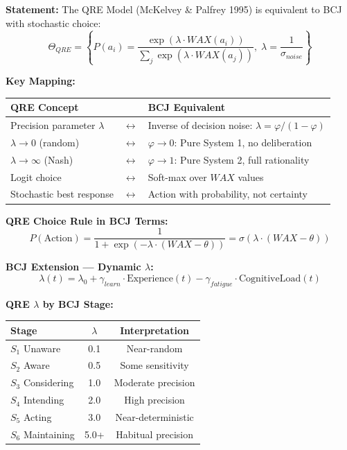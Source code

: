 \begin{tcolorbox}[colback=green!5!white, colframe=green!75!black,
    title=Theorem BCJ-T28: Quantal Response Equilibrium (QRE) as Special Case]
\textbf{Statement:} The QRE Model (McKelvey \& Palfrey 1995) is equivalent to BCJ with stochastic choice:
\begin{equation}
\Theta_{QRE} = \left\{P(a_i) = \frac{\exp(\lambda \cdot WAX(a_i))}{\sum_j \exp(\lambda \cdot WAX(a_j))}, \; \lambda = \frac{1}{\sigma_{noise}}\right\}
\end{equation}

\textbf{Key Mapping:}
\begin{center}
\begin{tabular}{lcl}
\toprule
\textbf{QRE Concept} & & \textbf{BCJ Equivalent} \\
\midrule
Precision parameter $\lambda$ & $\leftrightarrow$ & Inverse of decision noise: $\lambda = \varphi / (1-\varphi)$ \\
$\lambda \to 0$ (random) & $\leftrightarrow$ & $\varphi \to 0$: Pure System 1, no deliberation \\
$\lambda \to \infty$ (Nash) & $\leftrightarrow$ & $\varphi \to 1$: Pure System 2, full rationality \\
Logit choice & $\leftrightarrow$ & Soft-max over $WAX$ values \\
Stochastic best response & $\leftrightarrow$ & Action with probability, not certainty \\
\bottomrule
\end{tabular}
\end{center}

\textbf{QRE Choice Rule in BCJ Terms:}
\begin{equation}
P(\text{Action}) = \frac{1}{1 + \exp\left(-\lambda \cdot (WAX - \theta)\right)} = \sigma\left(\lambda \cdot (WAX - \theta)\right)
\end{equation}

\textbf{BCJ Extension --- Dynamic $\lambda$:}
\begin{equation}
\lambda(t) = \lambda_0 + \gamma_{learn} \cdot \text{Experience}(t) - \gamma_{fatigue} \cdot \text{CognitiveLoad}(t)
\end{equation}

\textbf{QRE $\lambda$ by BCJ Stage:}
\begin{center}
\begin{tabular}{lcc}
\toprule
\textbf{Stage} & \textbf{$\lambda$} & \textbf{Interpretation} \\
\midrule
$S_1$ Unaware & 0.1 & Near-random \\
$S_2$ Aware & 0.5 & Some sensitivity \\
$S_3$ Considering & 1.0 & Moderate precision \\
$S_4$ Intending & 2.0 & High precision \\
$S_5$ Acting & 3.0 & Near-deterministic \\
$S_6$ Maintaining & 5.0+ & Habitual precision \\
\bottomrule
\end{tabular}
\end{center}


\end{tcolorbox}
